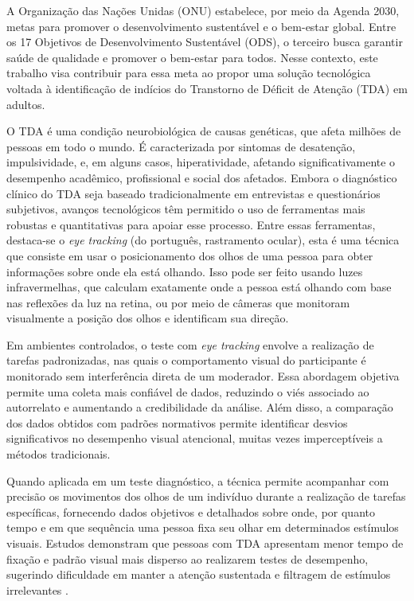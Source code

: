 A Organização das Nações Unidas (ONU) estabelece, por meio da Agenda 2030, metas para promover o desenvolvimento sustentável e o bem-estar global. Entre os 17 Objetivos de Desenvolvimento Sustentável (ODS), o terceiro busca garantir saúde de qualidade e promover o bem-estar para todos. Nesse contexto, este trabalho visa contribuir para essa meta ao propor uma solução tecnológica voltada à identificação de indícios do Transtorno de Déficit de Atenção (TDA) em adultos.\textcite{unitednations2015agenda2030}

O TDA é uma condição neurobiológica de causas genéticas, que afeta milhões de pessoas em todo o mundo. É caracterizada por sintomas de
desatenção, impulsividade, e, em alguns casos, hiperatividade, afetando significativamente o
desempenho acadêmico, profissional e social dos afetados. Embora o diagnóstico clínico do
TDA seja baseado tradicionalmente em entrevistas e questionários subjetivos, avanços
tecnológicos têm permitido o uso de ferramentas mais robustas e quantitativas para apoiar
esse processo. \textcite{BVS2014}
Entre essas ferramentas, destaca-se o \textit{eye tracking} (do português, rastramento ocular), esta é uma técnica
que consiste em usar o posicionamento dos olhos de uma pessoa para obter informações
sobre onde ela está olhando. Isso pode ser feito usando luzes infravermelhas, que calculam
exatamente onde a pessoa está olhando com base nas reflexões da luz na retina, ou por
meio de câmeras que monitoram visualmente a posição dos olhos e identificam sua direção.

Em ambientes controlados, o teste com \textit{eye tracking} envolve a realização de tarefas
padronizadas, nas quais o comportamento visual do participante é monitorado sem
interferência direta de um moderador. Essa abordagem objetiva permite uma coleta mais
confiável de dados, reduzindo o viés associado ao autorrelato e aumentando a credibilidade
da análise. Além disso, a comparação dos dados obtidos com padrões normativos permite
identificar desvios significativos no desempenho visual atencional, muitas vezes
imperceptíveis a métodos tradicionais.

Quando aplicada em um teste diagnóstico, a técnica permite acompanhar com
precisão os movimentos dos olhos de um indivíduo durante a realização de tarefas
específicas, fornecendo dados objetivos e detalhados sobre onde, por quanto tempo e em
que sequência uma pessoa fixa seu olhar em determinados estímulos visuais. Estudos
demonstram que pessoas com TDA apresentam menor tempo de fixação e padrão visual
mais disperso ao realizarem testes de desempenho, sugerindo dificuldade em manter a
atenção sustentada e filtragem de estímulos irrelevantes \textcite{Lim2024}.

